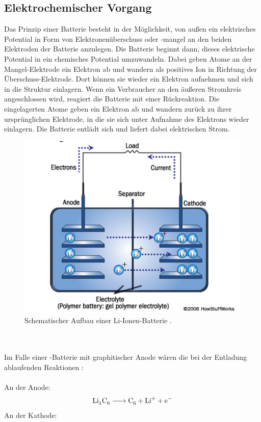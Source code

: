 \documentclass[a4paper, 11pt, headsepline,footsepline,twoside,abstract]{scrbook}
\begin{document}
\subsection{Elektrochemischer Vorgang}
Das Prinzip einer Batterie besteht in der Möglichkeit, von außen ein elektrisches Potential in Form von Elektronenüberschuss oder -mangel an den beiden Elektroden der Batterie anzulegen. Die Batterie beginnt dann, dieses elektrische Potential in ein chemisches Potential umzuwandeln. Dabei geben Atome an der Mangel-Elektrode ein Elektron ab und wandern als positives Ion in Richtung der Überschuss-Elektrode. Dort können sie wieder ein Elektron aufnehmen und sich in die Struktur einlagern. Wenn ein Verbraucher an den äußeren Stromkreis angeschlossen wird, reagiert die Batterie mit einer Rückreaktion. Die eingelagerten Atome geben ein Elektron ab und wandern zurück zu ihrer ursprünglichen Elektrode, in die sie sich unter Aufnahme des Elektrons wieder einlagern. Die Batterie entlädt sich und liefert dabei elektrischen Strom.
\begin{figure}[h]
	\centering
	\includegraphics[width=0.7\columnwidth]{images/Schematischer_Aufbau_Li_Ionen.png}
	\caption{Schematischer Aufbau einer Li-Ionen-Batterie \cite{howstuffworks}.}
	\label{Li-Ionen_Batterie}
\end{figure}
\\\\
Im Falle einer -Batterie mit graphitischer Anode wären die bei der Entladung ablaufenden Reaktionen \cite{minakshi2008book}:
\\\\
An der Anode:\\
\begin{equation}
	\ce{Li1C6 -> C6 + Li+ + e-}
\end{equation}
An der Kathode:\\
\end{document}
